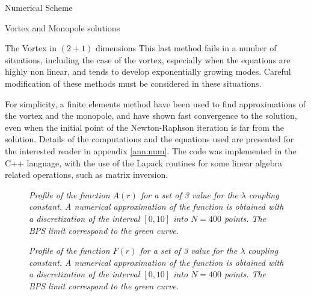 \begin{section}{Numerical Scheme}
\begin{subsection}{Vortex and Monopole solutions}
\begin{subsubsection}{The Vortex in $(2+1)$ dimensions}
      This last method fails in a number of situations, including the
      case of the vortex, especially when the equations are highly non
      linear, and tends to develop exponentially growing
      modes. Careful modification of these methods must be considered
      in these situations.

      For simplicity, a finite elements method have been used to find
      approximations of the vortex and the monopole, and have shown
      fast convergence to the solution, even when the initial point of
      the Newton-Raphson iteration is far from the solution. Details
      of the computations and the equations used are presented for the
      interested reader in appendix \ref{ann:num}.  The code was
      implemented in the C++ language, with the use of the Lapack
      routines for some linear algebra related operations, such as
      matrix inversion.

      \begin{figure}[!ht]
        \begin{center}
          
          \caption{\em Profile of the function $A(r)$ for a set of 3
            value for the $\lambda$ coupling constant. A numerical
            approximation of the function is obtained with a
            discretization of the interval $[0,10]$ into $N = 400$
            points. The BPS limit correspond to the green curve.}
          \label{fig:2d_vortex_a}
        \end{center}
      \end{figure}
      
      \begin{figure}[!ht]
        \begin{center}
          
          \caption{\em Profile of the function $F(r)$ for a set of 3
            value for the $\lambda$ coupling constant. A numerical
            approximation of the function is obtained with a
            discretization of the interval $[0,10]$ into $N = 400$
            points. The BPS limit correspond to the green curve.}
          \label{fig:2d_vortex_f}
        \end{center}
      \end{figure}
      

\end{subsubsection}
\end{subsection}
\end{section}
